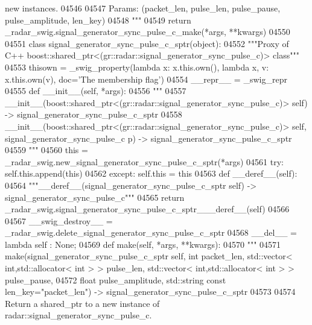\begin{DoxyCode}
{{{{{{{{{{{{{{{{{       new instances.}
04546 \textcolor{stringliteral}{}
04547 \textcolor{stringliteral}{    Params: (packet\_len, pulse\_len, pulse\_pause, pulse\_amplitude, len\_key)}
04548 \textcolor{stringliteral}{    """}
04549   \textcolor{keywordflow}{return} \_radar\_swig.signal\_generator\_sync\_pulse\_c\_make(*args, **kwargs)
04550 
04551 \textcolor{keyword}{class }signal_generator_sync_pulse_c_sptr(object):
04552     \textcolor{stringliteral}{"""Proxy of C++ boost::shared\_ptr<(gr::radar::signal\_generator\_sync\_pulse\_c)> class"""}
04553     thisown = _swig_property(\textcolor{keyword}{lambda} x: x.this.own(), \textcolor{keyword}{lambda} x, v: x.this.own(v), doc=\textcolor{stringliteral}{'The membership flag'})
04554     \_\_repr\_\_ = \_swig\_repr
04555     \textcolor{keyword}{def }__init__(self, *args): 
04556         \textcolor{stringliteral}{"""}
04557 \textcolor{stringliteral}{        \_\_init\_\_(boost::shared\_ptr<(gr::radar::signal\_generator\_sync\_pulse\_c)> self) ->
       signal\_generator\_sync\_pulse\_c\_sptr}
04558 \textcolor{stringliteral}{        \_\_init\_\_(boost::shared\_ptr<(gr::radar::signal\_generator\_sync\_pulse\_c)> self,
       signal\_generator\_sync\_pulse\_c p) -> signal\_generator\_sync\_pulse\_c\_sptr}
04559 \textcolor{stringliteral}{        """}
04560         this = \_radar\_swig.new\_signal\_generator\_sync\_pulse\_c\_sptr(*args)
04561         \textcolor{keywordflow}{try}: self.this.append(this)
04562         \textcolor{keywordflow}{except}: self.this = this
04563     \textcolor{keyword}{def }__deref__(self):
04564         \textcolor{stringliteral}{"""\_\_deref\_\_(signal\_generator\_sync\_pulse\_c\_sptr self) -> signal\_generator\_sync\_pulse\_c"""}
04565         \textcolor{keywordflow}{return} \_radar\_swig.signal\_generator\_sync\_pulse\_c\_sptr\_\_\_deref\_\_(self)
04566 
04567     \_\_swig\_destroy\_\_ = \_radar\_swig.delete\_signal\_generator\_sync\_pulse\_c\_sptr
04568     \_\_del\_\_ = \textcolor{keyword}{lambda} self : \textcolor{keywordtype}{None};
04569     \textcolor{keyword}{def }make(self, *args, **kwargs):
04570         \textcolor{stringliteral}{"""}
04571 \textcolor{stringliteral}{        make(signal\_generator\_sync\_pulse\_c\_sptr self, int packet\_len, std::vector< int,std::allocator< int
       > > pulse\_len, std::vector< int,std::allocator< int > > pulse\_pause, }
04572 \textcolor{stringliteral}{            float pulse\_amplitude, std::string const len\_key="packet\_len") ->
       signal\_generator\_sync\_pulse\_c\_sptr}
04573 \textcolor{stringliteral}{}
04574 \textcolor{stringliteral}{        Return a shared\_ptr to a new instance of radar::signal\_generator\_sync\_pulse\_c.}
}}}}}}}}}}}}}}}}
\end{DoxyCode}
